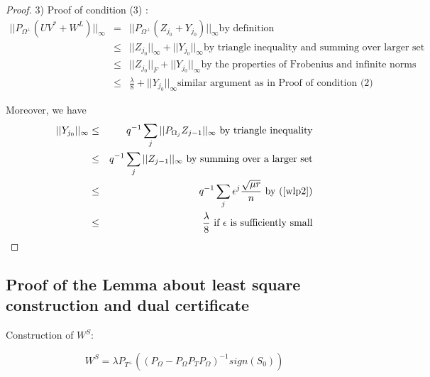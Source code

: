 \begin{proof}
3) Proof of condition (3) :
\begin{eqnarray*}
||P_{\Omega^{\bot}}(UV^{*}+W^{L})||_{\infty} & = & ||P_{\Omega^{\bot}}(Z_{j_{0}}+Y_{j_{0}})||_{\infty}\text{by definition}\\
 & \le & ||Z_{j_{0}}||_{\infty}+||Y_{j_{0}}||_{\infty} \text{by triangle inequality and summing over larger set}\\
 & \le & ||Z_{j_{0}}||_{F}+||Y_{j_{0}}||_{\infty} \text{by the properties of Frobenius and infinite norms}\\
 & \le & \frac{\lambda}{8}+||Y_{j_{0}}||_{\infty} \text{similar argument as in Proof of condition (2)}
\end{eqnarray*}


Moreover, we have
\begin{eqnarray*}
||Y_{j_{0}}||_{\infty} & \le & q^{-1}\sum_{j}||P_{\Omega_{j}}Z_{j-1}||_{\infty} \text{ by triangle inequality}\\
 & \le & q^{-1}\sum_{j}||Z_{j-1}||_{\infty} \text{ by summing over a larger set}\\
 & \le & q^{-1}\sum_{j}\epsilon^{j}\frac{\sqrt{\mu r}}{n} \text{ by (\ref{wlp2})}\\
 & \le & \frac{\lambda}{8}\text{ if \ensuremath{\epsilon}\ \text{is sufficiently small}}
\end{eqnarray*}

\end{proof}


\subsection{Proof of the Lemma about least square construction and dual certificate }

Construction of $W^{S}$:

\[
W^{S}=\lambda P_{T^{\bot}}((P_{\Omega}-P_{\Omega}P_{T}P_{\Omega})^{-1}sign(S_{0}))
\]

